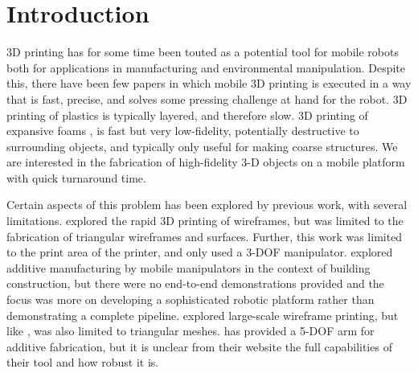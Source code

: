 \documentclass[conference]{acmsiggraph}
\begin{document}

\keywordlist


\TOGlinkslist


\copyrightspace

\section{Introduction}




3D printing has for some time been touted as a potential tool for mobile robots both for applications in manufacturing and environmental manipulation.  Despite this, there have been few papers in which mobile 3D printing is executed in a way that is fast, precise, and solves some pressing challenge at hand for the robot.  3D printing of plastics is typically layered, and therefore slow.  3D printing of expansive foams \cite{AirFoam}, \cite{RampFoam} is fast but very low-fidelity, potentially destructive to surrounding objects, and typically only useful for making coarse structures.  We are interested in the fabrication of high-fidelity 3-D objects on a mobile platform with quick turnaround time.

Certain aspects of this problem has been explored by previous work, with several limitations.  \cite{WirePrint} explored the rapid 3D printing of wireframes, but was limited to the fabrication of triangular wireframes and surfaces.  Further, this work was limited to the print area of the printer, and only used a 3-DOF manipulator.  \cite{ArmFab} explored additive manufacturing by mobile manipulators in the context of building construction, but there were no end-to-end demonstrations provided and the focus was more on developing a sophisticated robotic platform rather than demonstrating a complete pipeline.  \cite{ArchFab} explored large-scale wireframe printing, but like \cite{WirePrint}, was also limited to triangular meshes.  \cite{Mataerial} has provided a 5-DOF arm for additive fabrication, but it is unclear from their website the full capabilities of their tool and how robust it is.
\end{document}

